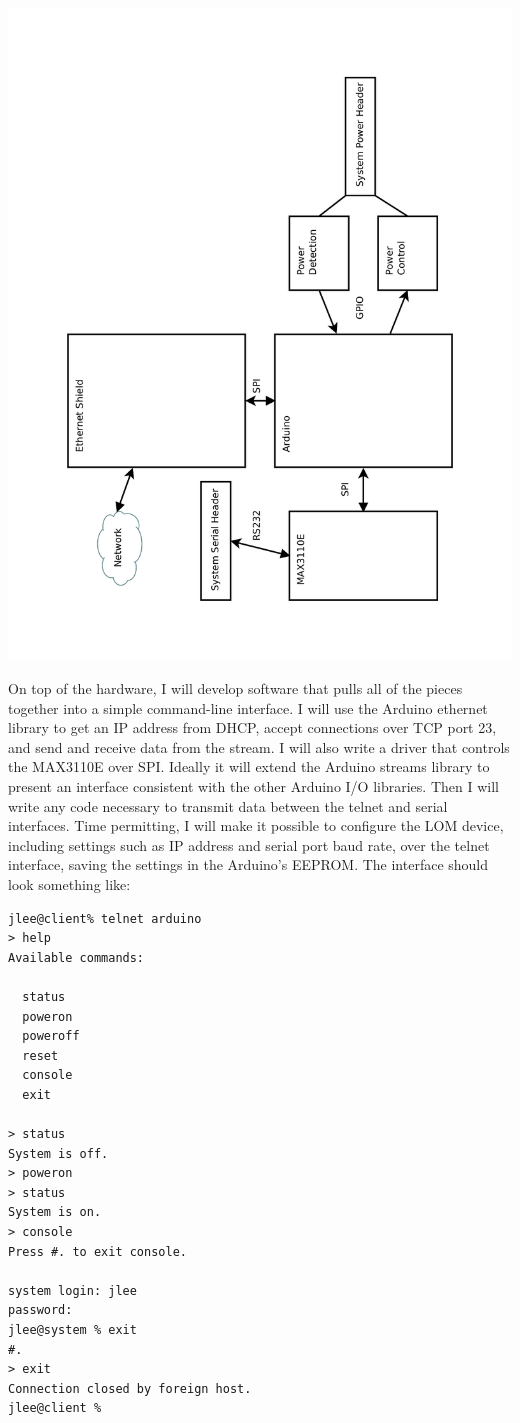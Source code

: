 \documentclass{amsart}
\begin{document}
\begin{center}
\includegraphics[height=\textwidth,angle=270]{hw-block.pdf}
\end{center}

On top of the hardware, I will develop software that pulls all of the pieces together into a simple command-line interface.  I will use the Arduino ethernet library to get an IP address from DHCP, accept connections over TCP port 23, and send and receive data from the stream.  I will also write a driver that controls the MAX3110E over SPI.  Ideally it will extend the Arduino streams library to present an interface consistent with the other Arduino I/O libraries.  Then I will write any code necessary to transmit data between the telnet and serial interfaces.  Time permitting, I will make it possible to configure the LOM device, including settings such as IP address and serial port baud rate, over the telnet interface, saving the settings in the Arduino's EEPROM.  The interface should look something like:

\begin{verbatim}
jlee@client% telnet arduino
> help
Available commands:

  status
  poweron
  poweroff
  reset
  console
  exit

> status
System is off.
> poweron
> status
System is on.
> console
Press #. to exit console.

system login: jlee
password: 
jlee@system % exit
#.
> exit
Connection closed by foreign host.
jlee@client %
\end{verbatim}
\end{document}
